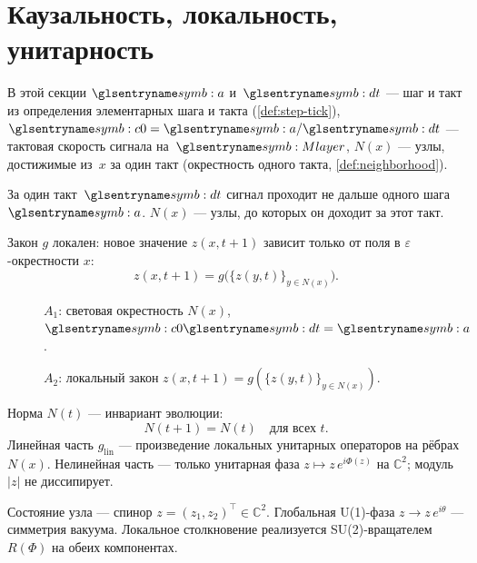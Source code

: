 \section{Каузальность, локальность, унитарность}

В этой секции $\caStepSpace$ и~$\htick$ --- шаг и такт из определения элементарных шага и такта (\cref{def:step-tick}),
$\caSignalSpeed=\caStepSpace/\htick$ --- тактовая скорость сигнала на~$\layerMicro$,
$N(x)$ --- узлы, достижимые из~$x$ за один такт (окрестность одного такта, \cref{def:neighborhood}).

\begin{axiom}[A1 · Каузальность]
\label{ax:A1}
За один такт~$\htick$ сигнал проходит не дальше одного шага~$\caStepSpace$.
$N(x)$ --- узлы, до которых он доходит за этот такт.
\end{axiom}

\begin{axiom}[A2 · Локальность]
\label{ax:A2}
Закон $g$ локален: новое значение $z(x,t+1)$ зависит только от поля в $\varepsilon$-окрестности $x$:
\[
  z(x,t+1)=g\bigl(\{z(y,t)\}_{y\in N(x)}\bigr).
\]
\end{axiom}

\begin{figure}[htbp]
  \centering
  
  \caption{$A_1$: световая окрестность $N(x)$, $\caSignalSpeed\htick=\caStepSpace$.}
  \label{fig:axiom-a1-neighborhood}
\end{figure}

\begin{figure}[htbp]
  \centering
  
  \caption{$A_2$: локальный закон $z(x,t{+}1)=g(\{z(y,t)\}_{y\in N(x)})$.}
  \label{fig:axiom-a2-local-law}
\end{figure}

\begin{axiom}
\label{ax:A3}
Норма $N(t)$ --- инвариант эволюции:
\[
N(t+1)=N(t)\quad\text{для всех }t.
\]
Линейная часть $g_{\mathrm{lin}}$ --- произведение локальных унитарных операторов на рёбрах $N(x)$.
Нелинейная часть --- только унитарная фаза $z\mapsto z\,e^{i\Phi(z)}$ на $\mathbb{C}^2$; модуль $|z|$ не диссипирует.
\end{axiom}

\begin{axiom}
\label{ax:A4}
Состояние узла --- спинор $z=(z_1,z_2)^\top\in\mathbb{C}^2$.
Глобальная U(1)-фаза $z\to z\,e^{i\theta}$ --- симметрия вакуума.
Локальное столкновение реализуется SU(2)-вращателем $R(\Phi)$ на обеих компонентах.
\end{axiom}

